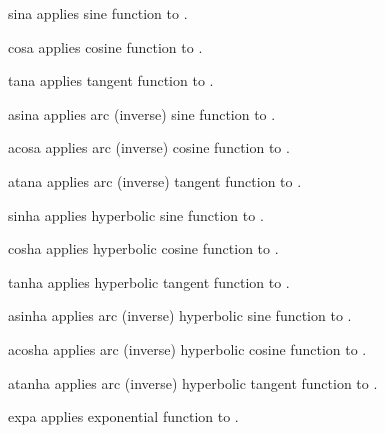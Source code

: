 \begin{funcdesc}{sin}{a}
applies sine function to .
\end{funcdesc}

\begin{funcdesc}{cos}{a}
applies cosine function to .
\end{funcdesc}

\begin{funcdesc}{tan}{a}
applies tangent function to .
\end{funcdesc}

\begin{funcdesc}{asin}{a}
applies arc (inverse) sine function to .
\end{funcdesc}

\begin{funcdesc}{acos}{a}
applies arc (inverse) cosine function to .
\end{funcdesc}

\begin{funcdesc}{atan}{a}
applies arc (inverse) tangent function to .
\end{funcdesc}

\begin{funcdesc}{sinh}{a}
applies hyperbolic sine function to .
\end{funcdesc}

\begin{funcdesc}{cosh}{a}
applies hyperbolic cosine function to .
\end{funcdesc}

\begin{funcdesc}{tanh}{a}
applies hyperbolic tangent function to .
\end{funcdesc}

\begin{funcdesc}{asinh}{a}
applies arc (inverse) hyperbolic sine function to .
\end{funcdesc}

\begin{funcdesc}{acosh}{a}
applies arc (inverse) hyperbolic cosine function to .
\end{funcdesc}

\begin{funcdesc}{atanh}{a}
applies arc (inverse) hyperbolic tangent function to .
\end{funcdesc}

\begin{funcdesc}{exp}{a}
applies exponential function to .
\end{funcdesc}

